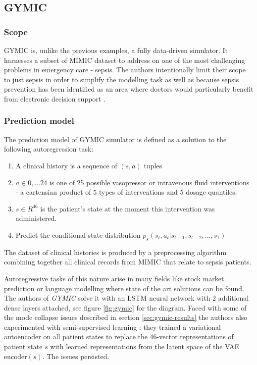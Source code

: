\subsection{GYMIC}
\label{sec:gymic}

\subsubsection{Scope}
GYMIC \cite{gymic} is, unlike the previous examples, a fully data-driven simulator. 
It harnesses a subset of MIMIC \cite{mimic} dataset to address on one of the most challenging problems in emergency care - sepsis.
The authors intentionally limit their scope to just sepsis in order to simplify the modelling task as well as because sepsis prevention has been identified as an area where doctors would particularly benefit from electronic decision support \cite{sepsis-motivation1,sepsis-motivation2}.

\subsubsection{Prediction model}
The prediction model of GYMIC simulator is defined as a solution to the following autoregression task:
\begin{enumerate}
    \item A clinical history is a sequence of $(s, a)$ tuples
    \item $a \in 0,\dots 24$ is one of 25 possible vasopressor or intravenous fluid interventions - a cartensian product of 5 types of interventions and 5 dosage quantiles. 
    \item $s \in R^{46}$ is the patient's state at the moment this intervention was administered.
    \item Predict the conditional state distribution $p_s(s_t, a_t | s_{t-1},s_{t-2},\dots,s_1)$
\end{enumerate}

The dataset of clinical histories is produced by a preprocessing algorithm combining together all clinical records from MIMIC that relate to sepsis patients.

Autoregressive tasks of this nature arise in many fields like stock market prediction \cite{stonks1,stonks2} or language modelling \cite{langmodels} where state of the art solutions can be found.
The authors of \emph{GYMIC} solve it with an LSTM \cite{hochreiterLongShorttermMemory1997} neural network with 2 additional dense layers attached, see figure \ref{fig:gymic} for the diagram.
Faced with some of the mode collapse issues described in section \ref{sec:gymic-results} the authors also experimented with semi-supervised learning \cite{semi-supervised}: they trained a variational autoencoder \cite{vae} on all patient states to replace the 46-vector representations of patient state $s$ with learned representations from the latent space of the VAE $\text{encoder}(s)$.
The issues persisted.

